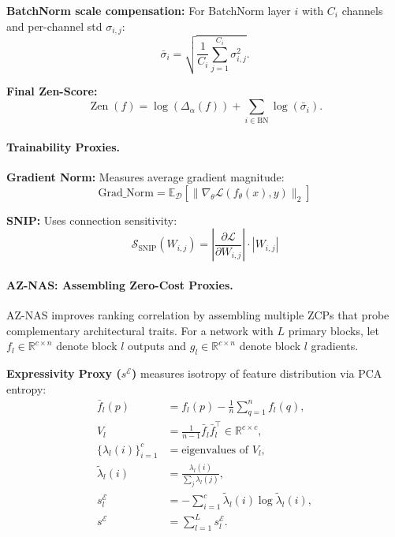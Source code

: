 \textbf{BatchNorm scale compensation:} For BatchNorm layer $i$ with $C_i$ channels and per-channel std $\sigma_{i,j}$:
\begin{equation}
	\bar{\sigma}_i = \sqrt{\frac{1}{C_i}\sum_{j=1}^{C_i} \sigma_{i,j}^2 }.
\end{equation}

\textbf{Final Zen-Score:}
\begin{equation}\label{eq:zen}
	\operatorname{Zen}(f) = \log( \Delta_\alpha(f) ) + \sum_{i\in\mathrm{BN}} \log(\bar{\sigma}_i).
\end{equation}

\paragraph{Trainability Proxies.}

\textbf{Gradient Norm:} Measures average gradient magnitude:
\begin{equation}
	\text{Grad\_Norm} = \mathbb{E}_{\mathcal{D}}\left[\|\nabla_\theta \mathcal{L}(f_\theta(x), y)\|_2\right]
\end{equation}

\textbf{SNIP:} Uses connection sensitivity:
\begin{equation}
	\mathcal{S}_{\text{SNIP}}(W_{i,j}) = \left|\frac{\partial \mathcal{L}}{\partial W_{i,j}}\right| \cdot |W_{i,j}|
\end{equation}

\paragraph{AZ-NAS: Assembling Zero-Cost Proxies. }
AZ-NAS \cite{lee2024aznasassemblingzerocostproxies} improves ranking correlation by assembling multiple ZCPs that probe complementary architectural traits. For a network with $L$ primary blocks, let $f_l \in \mathbb{R}^{c \times n}$ denote block $l$ outputs and $g_l \in \mathbb{R}^{c \times n}$ denote block $l$ gradients.

\textbf{Expressivity Proxy ($s^{\mathcal{E}}$)} measures isotropy of feature distribution via PCA entropy:
\begin{align}
	\bar f_l(p) &= f_l(p) - \frac{1}{n}\sum_{q=1}^n f_l(q),\\
	V_l &= \frac{1}{n-1}\bar f_l\bar f_l^\top \in\mathbb{R}^{c\times c},\\
	\{\lambda_l(i)\}_{i=1}^c &= \text{eigenvalues of }V_l,\\
	\tilde\lambda_l(i) &= \frac{\lambda_l(i)}{\sum_{j}\lambda_l(j)},\\
	s_l^{\mathcal{E}} &= -\sum_{i=1}^c \tilde\lambda_l(i)\log\tilde\lambda_l(i),\\
	s^{\mathcal{E}} &= \sum_{l=1}^L s_l^{\mathcal{E}}.
\end{align}

